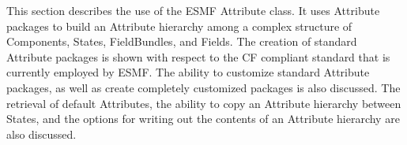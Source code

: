 %


This section describes the use of the ESMF Attribute class.  It uses Attribute packages to build an Attribute hierarchy among a complex structure of Components, States, FieldBundles, and Fields.  The creation of standard Attribute packages is shown with respect to the CF compliant standard that is currently employed by ESMF.  The ability to customize standard Attribute packages, as well as create completely customized packages is also discussed.  The retrieval of default Attributes, the ability to copy an Attribute hierarchy between States, and the options for writing out the contents of an Attribute hierarchy are also discussed.


